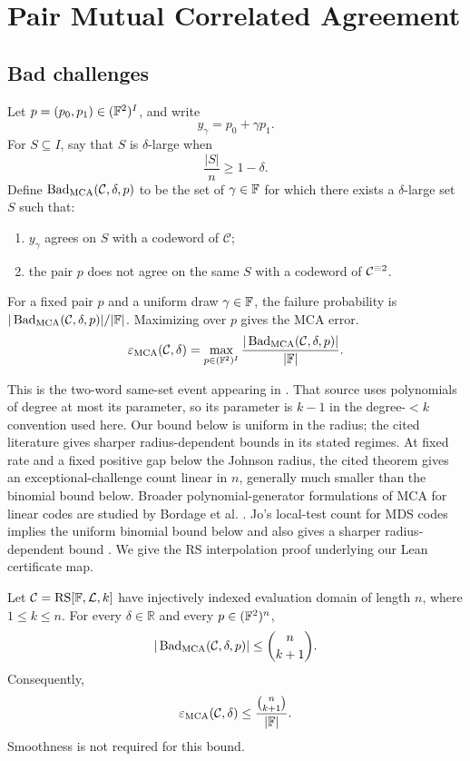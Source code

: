 \section{Pair Mutual Correlated Agreement}

\subsection{Bad challenges}
\label{sec:mca-bad-challenges}

Let \(p=(p_0,p_1)\in(\mathbb{F}^2)^I\), and write
\[
  y_\gamma=p_0+\gamma p_1.
\]
For \(S\subseteq I\), say that \(S\) is \(\delta\)-large when
\[
  \frac{|S|}{n}\ge1-\delta.
\]
Define \(\operatorname{Bad}_{\operatorname{MCA}}(\mathcal C,\delta,p)\) to be the set of
\(\gamma\in\mathbb{F}\) for which there exists a \(\delta\)-large set \(S\) such that:
\begin{enumerate}[label=(\roman*)]
  \item \(y_\gamma\) agrees on \(S\) with a codeword of \(\mathcal C\);
  \item the pair \(p\) does not agree on the same \(S\) with a codeword of
    \(\mathcal C^{\equiv 2}\).
\end{enumerate}
For a fixed pair \(p\) and a uniform draw \(\gamma\in\mathbb{F}\), the failure
probability is \(|\operatorname{Bad}_{\operatorname{MCA}}(\mathcal C,\delta,p)|/|\mathbb{F}|\).
Maximizing over \(p\) gives the MCA error.
\[
  \varepsilon_{\operatorname{MCA}}(\mathcal C,\delta)
  =
  \max_{p\in(\mathbb{F}^2)^I}
  \frac{|\operatorname{Bad}_{\operatorname{MCA}}(\mathcal C,\delta,p)|}{|\mathbb{F}|}.
\]

This is the two-word same-set event appearing in
\cite[Theorem~4.6, full version]{benSassonCarmonHabockKoppartySaraf2026}.
That source uses polynomials of degree at most its parameter, so its
parameter is \(k-1\) in the degree-\(<k\) convention used here.
Our bound below is uniform in the radius; the cited literature gives
sharper radius-dependent bounds in its stated regimes. At fixed rate and a
fixed positive gap below the Johnson radius, the cited theorem gives an
exceptional-challenge count linear in \(n\), generally much smaller than
the binomial bound below. Broader polynomial-generator formulations of MCA
for linear codes are studied by Bordage et al.
\cite{bordageEtAl2026polynomialMCA}.
Jo's local-test count for MDS codes implies the uniform binomial bound
below and also gives a sharper radius-dependent bound
\cite[Theorem~4.2]{jo2026beyondJohnson}. We give the RS interpolation proof
underlying our Lean certificate map.

\begin{theorem}
\label{thm:pair-mca}
Let \(\mathcal C=\operatorname{RS}[\mathbb{F},\mathcal L,k]\) have injectively indexed
evaluation domain of length \(n\), where \(1\le k\le n\).  For every
\(\delta\in\mathbb R\) and every \(p\in(\mathbb{F}^2)^n\),
\[
  |\operatorname{Bad}_{\operatorname{MCA}}(\mathcal C,\delta,p)|
  \le \binom n{k+1}.
\]
Consequently,
\[
  \varepsilon_{\operatorname{MCA}}(\mathcal C,\delta)
  \le \frac{\binom n{k+1}}{|\mathbb{F}|}.
\]
Smoothness is not required for this bound.
\end{theorem}

